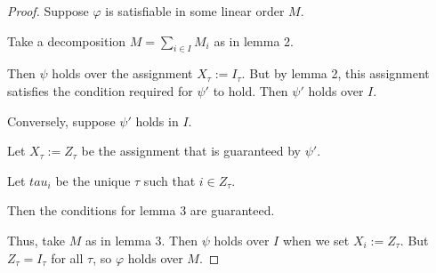 \documentclass{article}
\begin{document}
\begin{proof}
  Suppose $\varphi$ is satisfiable in some linear order $M$.

  Take a decomposition $M = \sum_{i \in I} M_i$ as in lemma 2.

  Then $\psi$ holds over the assignment $X_\tau := I_\tau$. But by lemma 2, this assignment
  satisfies the condition required for $\psi'$ to hold. Then $\psi'$ holds over $I$.

  Conversely, suppose $\psi'$ holds in $I$.

  Let $X_\tau := Z_\tau$ be the assignment that is guaranteed by $\psi'$.

  Let $tau_i$ be the unique $\tau$ such that $i \in Z_\tau$.

  Then the conditions for lemma 3 are guaranteed.

  Thus, take $M$ as in lemma 3. Then $\psi$ holds over $I$ when we set $X_i := Z_\tau$.
  But $Z_\tau = I_\tau$ for all $\tau$, so $\varphi$ holds over $M$.
\end{proof}
\end{document}
